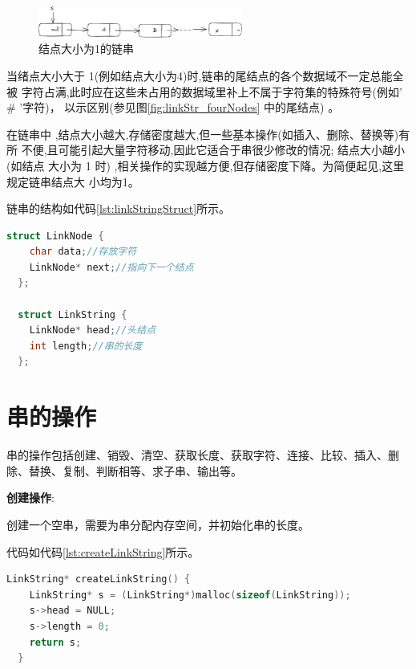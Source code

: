 \documentclass[lang=cn,newtx,10pt,scheme=chinese]{elegantbook}
\begin{document}
\begin{figure}[h]
  \centering
  \includegraphics[width=0.6\textwidth]{./figure/pdf/cropped/linkStr_oneNode.pdf}
  \caption{结点大小为1的链串}
  \label{fig:linkStr_oneNode}

\end{figure}

当绪点大小大于 1(例如结点大小为4)时,链串的尾结点的各个数据域不一定总能全被
字符占满,此时应在这些未占用的数据域里补上不属于字符集的特殊符号(例如' \# '字符)，
以示区别(参见图\ref{fig:linkStr_fourNodes} 中的尾结点) 。

在链串中 ,结点大小越大,存储密度越大,但一些基本操作(如插入、删除、替换等)有所
不便,且可能引起大量字符移动,因此它适合于串很少修改的情况; 结点大小越小(如结点
大小为 1 时) ,相关操作的实现越方便,但存储密度下降。为简便起见,这里规定链串结点大
小均为1。

链串的结构如代码\ref{lst:linkStringStruct}所示。

\begin{lstlisting}[language=C++, caption={链串结构体定义}, label={lst:linkStringStruct}]
  struct LinkNode {
    char data;//存放字符
    LinkNode* next;//指向下一个结点
  };

  struct LinkString {
    LinkNode* head;//头结点
    int length;//串的长度
  };
\end{lstlisting}

\section{串的操作}

串的操作包括创建、销毁、清空、获取长度、获取字符、连接、比较、插入、删除、替换、复制、判断相等、求子串、输出等。

\textbf{创建操作}:

创建一个空串，需要为串分配内存空间，并初始化串的长度。

代码如代码\ref{lst:createLinkString}所示。

\begin{lstlisting}[language=C++, caption={创建一个空串示例代码}, label={lst:createLinkString}]
  LinkString* createLinkString() {
    LinkString* s = (LinkString*)malloc(sizeof(LinkString));
    s->head = NULL;
    s->length = 0;
    return s;
  }

\end{lstlisting}
\end{document}
